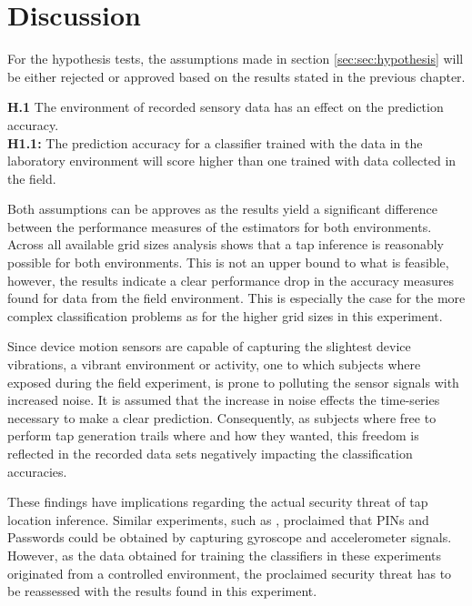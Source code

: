 \section{Discussion}
For the hypothesis tests, the assumptions made in section \ref{sec:sec:hypothesis} will be either rejected or approved based on the results stated in the previous chapter.

\begin{center}
  \begin{mdframed}[backgroundcolor=green!005] 
    \textbf{H.1}  The environment of recorded sensory data has an effect on the prediction accuracy.\\
    \hline
    \textbf{H1.1:} The prediction accuracy for a classifier trained with the data in the laboratory environment will score higher than one trained with data collected in the field.
  \end{mdframed}
\end{center}

Both assumptions can be approves as the results yield a significant difference between the performance measures of the estimators for both environments. Across all available grid sizes analysis shows that a tap inference is reasonably possible for both environments. This is not an upper bound to what is feasible, however, the results indicate a clear performance drop in the accuracy measures found for data from the field environment. This is especially the case for the more complex classification problems as for the higher grid sizes in this experiment.


Since device motion sensors are capable of capturing the slightest device vibrations, a vibrant environment or activity, one to which subjects where exposed during the field experiment, is prone to polluting the sensor signals with increased noise. It is assumed that the increase in noise effects the time-series necessary to make a clear prediction. Consequently, as subjects where free to perform tap generation trails where and how they wanted, this freedom is reflected in the recorded data sets negatively impacting the classification accuracies.

These findings have implications regarding the actual security threat of tap location inference. Similar experiments, such as \cite{Tapprints, Accessory}, proclaimed that PINs and Passwords could be obtained by capturing gyroscope and accelerometer signals. However, as the data obtained for training the classifiers in these experiments originated from a controlled environment, the proclaimed security threat has to be reassessed with the results found in this experiment. \\

